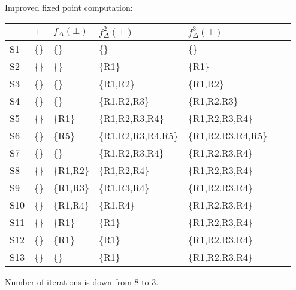 \begin{slide*}
Improved fixed point computation:\\

\renewcommand{\tabcolsep}{1.0ex}
\begin{scriptsize}
\begin{tt}
\begin{tabular}{|l|l|l|l|l|l|l|}
\hline
 & $\bot$ & $f_{\Delta}(\bot)$ & $f_{\Delta}^2(\bot)$ & $f_{\Delta}^3(\bot)$ 
\\\hline
S1 & \{\}& \{\}&  \{\} &\{\} \\\hline
S2 & \{\}& \{\}& \{R1\}  &\{R1\} \\\hline
S3 & \{\}& \{\}& \{R1,R2\}  &\{R1,R2\} \\\hline
S4 & \{\}& \{\}& \{R1,R2,R3\}  &\{R1,R2,R3\} \\\hline
S5 & \{\}&\{R1\} & \{R1,R2,R3,R4\}   &\{R1,R2,R3,R4\} \\\hline
S6 & \{\}& \{R5\}& \{R1,R2,R3,R4,R5\} &\{R1,R2,R3,R4,R5\} \\\hline
S7 & \{\}& \{\}& \{R1,R2,R3,R4\}  &\{R1,R2,R3,R4\} \\\hline
S8 & \{\}& \{R1,R2\}& \{R1,R2,R4\}  &\{R1,R2,R3,R4\} \\\hline
S9 & \{\}& \{R1,R3\}& \{R1,R3,R4\}  &\{R1,R2,R3,R4\} \\\hline
S10 & \{\}&  \{R1,R4\}& \{R1,R4\} &\{R1,R2,R3,R4\} \\\hline
S11 & \{\}& \{R1\} & \{R1\} &\{R1,R2,R3,R4\} \\\hline
S12  & \{\}&  \{R1\}& \{R1\} &\{R1,R2,R3,R4\} \\\hline
S13  & \{\}&  \{\}& \{R1\} &\{R1,R2,R3,R4\} \\\hline
\end{tabular}
\end{tt}
\end{scriptsize}
\vspace*{2ex}

Number of iterations is down from 8 to 3.

\vfil
\end{slide*}

